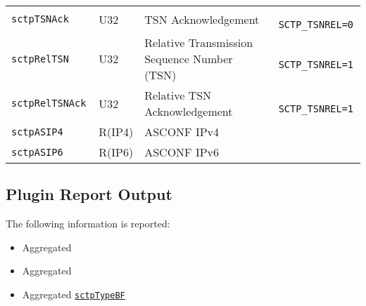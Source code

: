 \documentclass[documentation]{subfiles}
\begin{document}
\begin{longtable}{>{\tt}lll>{\tt\small}l}
    sctpTSNAck         & U32          & TSN Acknowledgement                         & SCTP\_TSNREL=0\\
    sctpRelTSN         & U32          & Relative Transmission Sequence Number (TSN) & SCTP\_TSNREL=1\\
    sctpRelTSNAck      & U32          & Relative TSN Acknowledgement                & SCTP\_TSNREL=1\\
    sctpASIP4          & R(IP4)       & ASCONF IPv4                                 & \\
    sctpASIP6          & R(IP6)       & ASCONF IPv6                                 & \\
    \bottomrule
\end{longtable}

\subsection{Plugin Report Output}
The following information is reported:
\begin{itemize}
    \item Aggregated {\tt{}}
    \item Aggregated {\tt{}}
    \item Aggregated {\tt\hyperref[sctpType]{sctpTypeBF}}
\end{itemize}
\end{document}
